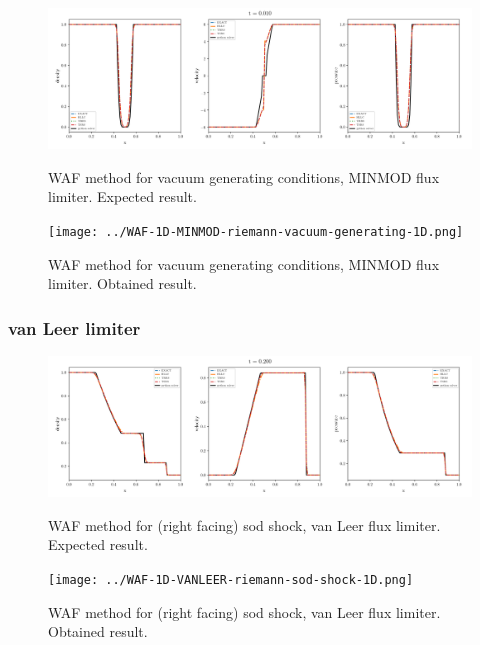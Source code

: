     \begin{figure}[htbp]
        \centering
        \includegraphics[width=.9\textwidth]{./figures/WAF-1D-MINMOD-riemann-vacuum-generating-1D.png}%
        \caption{WAF method for vacuum generating conditions, MINMOD flux limiter. Expected result.}
        \texttt{[image: ../WAF-1D-MINMOD-riemann-vacuum-generating-1D.png]}%
        \caption{WAF method for vacuum generating conditions, MINMOD flux limiter. Obtained result.}
    \end{figure}







\clearpage
\subsubsection{van Leer limiter}

    \begin{figure}[htbp]
        \centering
        \includegraphics[width=.9\textwidth]{./figures/WAF-1D-VANLEER-riemann-sod-shock-1D.png}%
        \caption{WAF method for (right facing) sod shock, van Leer flux limiter. Expected result.}
        \texttt{[image: ../WAF-1D-VANLEER-riemann-sod-shock-1D.png]}%
        \caption{WAF method for (right facing) sod shock, van Leer flux limiter. Obtained result.}
    \end{figure}


